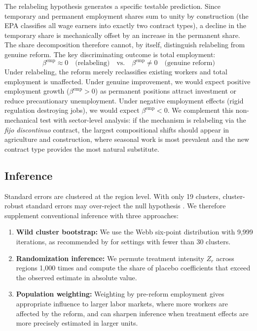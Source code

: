 \documentclass[12pt]{article}
\begin{document}
The relabeling hypothesis generates a specific testable prediction. Since temporary and permanent employment shares sum to unity by construction (the EPA classifies all wage earners into exactly two contract types), a decline in the temporary share is mechanically offset by an increase in the permanent share. The share decomposition therefore cannot, by itself, distinguish relabeling from genuine reform. The key discriminating outcome is total employment:
\begin{equation}
\beta^{\text{emp}} \approx 0 \quad \text{(relabeling)} \quad \text{vs.} \quad \beta^{\text{emp}} \neq 0 \quad \text{(genuine reform)}
\label{eq:relabel}
\end{equation}
Under relabeling, the reform merely reclassifies existing workers and total employment is unaffected. Under genuine improvement, we would expect positive employment growth ($\beta^{\text{emp}} > 0$) as permanent positions attract investment or reduce precautionary unemployment. Under negative employment effects (rigid regulation destroying jobs), we would expect $\beta^{\text{emp}} < 0$. We complement this non-mechanical test with sector-level analysis: if the mechanism is relabeling via the \emph{fijo discontinuo} contract, the largest compositional shifts should appear in agriculture and construction, where seasonal work is most prevalent and the new contract type provides the most natural substitute.

\subsection{Inference}

Standard errors are clustered at the region level. With only 19 clusters, cluster-robust standard errors may over-reject the null hypothesis \citep{cameron2008bootstrap}. We therefore supplement conventional inference with three approaches:

\begin{enumerate}
\item \textbf{Wild cluster bootstrap:} We use the Webb six-point distribution with 9,999 iterations, as recommended by \citet{roodman2019fast} for settings with fewer than 30 clusters.

\item \textbf{Randomization inference:} We permute treatment intensity $Z_r$ across regions 1,000 times and compute the share of placebo coefficients that exceed the observed estimate in absolute value.

\item \textbf{Population weighting:} Weighting by pre-reform employment gives appropriate influence to larger labor markets, where more workers are affected by the reform, and can sharpen inference when treatment effects are more precisely estimated in larger units.
\end{enumerate}
\end{document}
